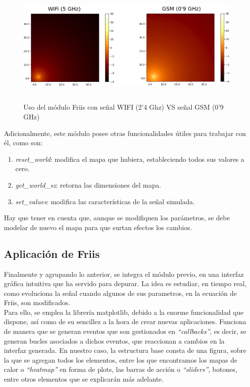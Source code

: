 \begin{figure} [tp]
	\begin{center}
	\includegraphics[height=6cm]{imagenes/cap4/4_heatmap_example.png}
	\end{center}
	\caption[Uso del módulo Friis con señal WIFI (5 GHz) VS señal GSM (0'9 GHz)]{Uso del módulo Friis con señal WIFI (2'4 Ghz) VS señal GSM (0'9 GHz)}
	\label{fig:heat_ex}
\end{figure}

Adicionalmente, este módulo posee otras funcionalidades útiles para trabajar con él, como son:

\begin{enumerate}
    \item \emph{reset\_world}: modifica el mapa que hubiera, estableciendo todos sus valores a cero.
    \item \emph{get\_world\_sz}: retorna las dimensiones del mapa.
    \item \emph{set\_values}: modifica las características de la señal simulada.
\end{enumerate}

Hay que tener en cuenta que, aunque se modifiquen los parámetros, se debe modelar de nuevo el mapa para que surtan efectos los cambios.\\

\subsection{Aplicación de Friis}
\label{subsec:friis-app}

Finalmente y agrupando lo anterior, se integra el módulo previo, en una interfaz gráfica intuitiva que ha servido para depurar. La idea es estudiar, en tiempo real, como evoluciona la señal cuando algunos de sus parametros, en la ecuación de Friis, son modificados.\\

Para ello, se emplea la librería matplotlib, debido a la enorme funcionalidad que dispone, así como de su sencillez a la hora de crear nuevas aplicaciones. Funciona de manera que se generan eventos que son gestionados en \emph{``callbacks''}, es decir, se generan bucles asociados a dichos eventos, que reaccionan a cambios en la interfaz generada. En nuestro caso, la estructura base consta de una figura, sobre la que se agregan todos los elementos, entre los que encontramos los mapas de calor o \emph{``heatmap''} en forma de plots, las barras de acción o \emph{``sliders''}, botones, entre otros elementos que se explicarán más adelante.\\

